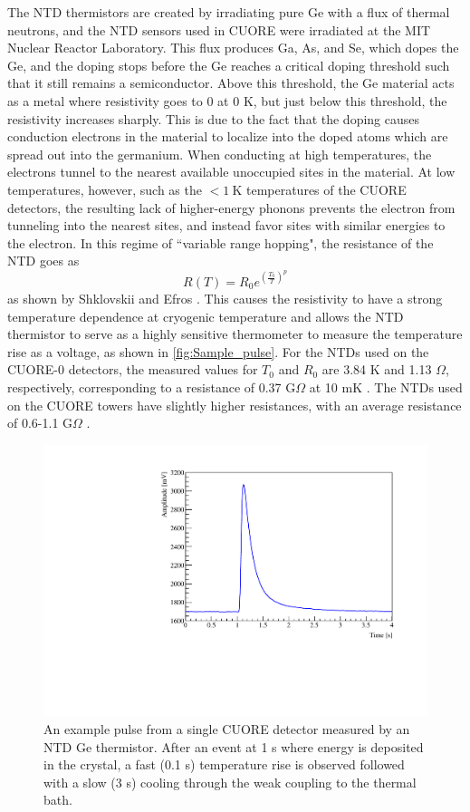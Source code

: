 The NTD thermistors are created by irradiating pure Ge with a flux of thermal neutrons, and the NTD sensors used in CUORE were irradiated at the MIT Nuclear Reactor Laboratory.
This flux produces Ga, As, and Se, which dopes the Ge, and the doping stops before the Ge reaches a critical doping threshold such that it still remains a semiconductor.
Above this threshold, the Ge material acts as a metal where resistivity goes to 0 at 0 K, but just below this threshold, the resistivity increases sharply.
This is due to the fact that the doping causes conduction electrons in the material to localize into the doped atoms which are spread out into the germanium.
When conducting at high temperatures, the electrons tunnel to the nearest available unoccupied sites in the material.
At low temperatures, however, such as the $<1~\textrm{K}$ temperatures of the CUORE detectors, the resulting lack of higher-energy phonons prevents the electron from tunneling into the nearest sites, and instead favor sites with similar energies to the electron.
In this regime of ``variable range hopping", the resistance of the NTD goes as
\begin{equation}
    R(T) = R_0 e^{\left(\frac{T_0}{T}\right)^p} 
    \label{eq:NTD_Resistivity}
\end{equation}
as shown by Shklovskii and Efros \cite{NTDResistivity}.
This causes the resistivity to have a strong temperature dependence at cryogenic temperature and allows the NTD thermistor to serve as a highly sensitive thermometer to measure the temperature rise as a voltage, as shown in \autoref{fig:Sample_pulse}.
For the NTDs used on the CUORE-0 detectors, the measured values for $T_0$ and $R_0$ are 3.84 K and 1.13 $\Omega$, respectively, corresponding to a resistance of 0.37 G$\Omega$ at 10 mK \cite{Alduino:2016vjd}.
The NTDs used on the CUORE towers have slightly higher resistances, with an average resistance of 0.6-1.1 G$\Omega$ \cite{Nutini:LoadCurves}.

\begin{figure}[htbp]
\centering
\includegraphics[width=0.7\linewidth]{Figures/pulse-conference.pdf}
\caption[An example pulse from a single CUORE detector measured by an NTD Ge thermistor]
{An example pulse from a single CUORE detector measured by an NTD Ge thermistor.
After an event at 1 s where energy is deposited in the crystal, a fast (0.1 s) temperature rise is observed followed with a slow (3 s) cooling through the weak coupling to the thermal bath.}
\label{fig:Sample_pulse}
\end{figure}

